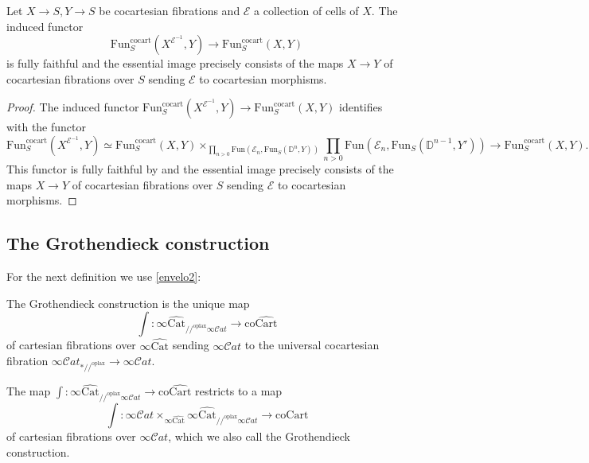 \documentclass[10pt,oneside]{article}
\numberwithin{equation}{section} %
\numberwithin{figure}{section} %
\theoremstyle{plain}
\theoremstyle{definition}
\newcommand{\bD}{{\mathbb D}}
\newcommand{\mE}{{\mathcal E}}
\newcommand{\co}{\mathrm{co}}
\newcommand{\Cat}{\mathrm{Cat}}
\newcommand{\Fun}{\mathrm{Fun}}
\newcommand{\cocart}{{\mathrm{cocart}}}
\newcommand{\Cart}{{\mathrm{Cart}}}
\newcommand{\oplax}{{\mathrm{oplax}}}
\newcommand{\coCart}{{\mathrm{coCart}}}
\newcommand{\scat}{\mathcal{C}\mathit{at}}
\begin{document}
\begin{lemma}

Let $X \to S, Y \to S$ be cocartesian fibrations and $\mE $ a collection of cells of $X.$
The induced functor
$$ \Fun^\cocart_S(X^{\mE^{-1}},Y) \to \Fun^\cocart_S(X,Y) $$ is fully faithful and the essential image precisely consists of the maps $X \to Y$ of cocartesian fibrations over $S$ sending $\mE$ to cocartesian morphisms.

\end{lemma}

\begin{proof}
The induced functor
$ \Fun^\cocart_S(X^{\mE^{-1}},Y) \to \Fun^\cocart_S(X,Y) $ identifies with the functor
$$ \Fun^\cocart_S(X^{\mE^{-1}},Y) \simeq \Fun^\cocart_S(X,Y) \times_{\prod_{n > 0}\Fun(\mE_n, \Fun_S(\bD^n,Y))} \prod_{n > 0}\Fun(\mE_n,\Fun_S(\bD^{n-1},Y')) \to \Fun^\cocart_S(X,Y). $$
This functor is fully faithful by \cite[Corollary 4.1.4.]{oriented} and the essential image precisely consists of the maps $X \to Y$ of cocartesian fibrations over $S$ sending $\mE$ to cocartesian morphisms.
\end{proof}

\subsection{The Grothendieck construction}

For the next definition we use \cref{envelo2}:

\begin{definition}

The Grothendieck construction is the unique map
$$\int: \infty\widehat{\Cat}_{//^\oplax \infty\scat} \to \co\widehat{\Cart}$$
of cartesian fibrations over
$\infty\widehat{\Cat}$ sending $\infty\scat$ to the universal cocartesian fibration $ \infty\scat_{*//^\oplax} \to \infty\scat.$

The map $\int: \infty\widehat{\Cat}_{//^\oplax \infty\scat} \to \co\widehat{\Cart}$ 
restricts to a map 
\begin{equation}\label{GroCon}
\int: \infty\scat \times_{\infty\widehat{\Cat}} \infty\widehat{\Cat}_{//^\oplax \infty\scat} \to \coCart
\end{equation} of cartesian fibrations over $\infty\scat$,
which we also call the Grothendieck construction.

\end{definition}
\end{document}
